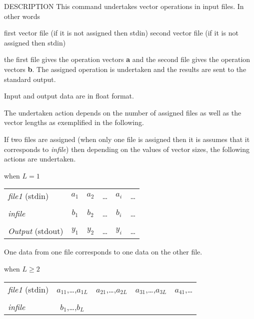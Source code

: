 \begin{qsection}{DESCRIPTION}
This command undertakes vector operations in input files.
In other words
\begin{description}
first vector file (if it is not assigned then stdin)
second vector file (if it is not assigned then stdin)
\end{description}
the first file gives the operation vectors {\bf a}
and the second file gives the operation vectors {\bf b}.
The assigned operation is undertaken and the results
are sent to the standard output.
\par
Input and output data are in float format.
\par
The undertaken action depends on the number of assigned files
as well as the vector lengths as exemplified in the following.
\par
If two files are assigned (when only one file is assigned
then it is assumes that it corresponds to {\em infile}) then
depending on the values of vector sizes, the following actions
are undertaken.
\begin{description}
\item{when $L=1$}~\\
\begin{tabular}{l|c|c|c|c|c} \cline{2-6}
{\em file1} (stdin)	& {$a_1$} & {$a_2$} & {\dots}
			& {$a_i$} & {\dots} \\ \cline{2-6}
\multicolumn{6}{c}{}	\\[-10pt] \cline{2-6}
{\em infile}		& {$b_1$} & {$b_2$} & {\dots}
			& {$b_i$} & {\dots} \\ \cline{2-6}
\multicolumn{6}{c}{}	\\[-10pt] \cline{2-6}
{\em Output} (stdout)	& {$y_1$} & {$y_2$} & {\dots}
			& {$y_i$} & {\dots} \\ \cline{2-6}
\end{tabular}
\par
One data from one file corresponds to one data on the other file.
\item{when $L\geq 2$}~\\
\begin{tabular}{l|c|c|c|l} \cline{2-5}
{\em file1} (stdin)	& {$a_{11}$,\dots,$a_{1L}$}
			& {$a_{21}$,\dots,$a_{2L}$}
			& {$a_{31}$,\dots,$a_{3L}$}
			& {$a_{41}$,\dots} \\ \cline{2-5}
\multicolumn{5}{c}{}	\\[-10pt]
			\cline{2-2}
{\em infile}		& {$b_{1}$,\dots,$b_{L}$}
			& \multicolumn{3}{c}{} \\ \cline{2-2}

\end{tabular}
\end{description}
\end{qsection}

